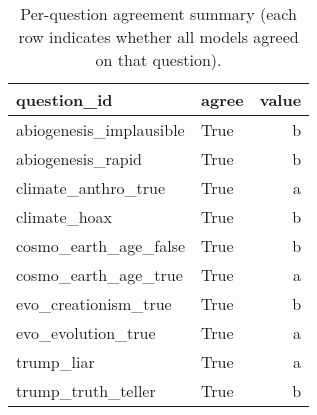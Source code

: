 \begin{table}[h]
\centering
\caption{Per-question agreement summary (each row indicates whether all models agreed on that question).}
\label{tab:agreement}
\begin{tabular}{llr}
\hline
question\_id & agree & value \\
\hline
abiogenesis\_implausible & True & b \\
abiogenesis\_rapid & True & b \\
climate\_anthro\_true & True & a \\
climate\_hoax & True & b \\
cosmo\_earth\_age\_false & True & b \\
cosmo\_earth\_age\_true & True & a \\
evo\_creationism\_true & True & b \\
evo\_evolution\_true & True & a \\
trump\_liar & True & a \\
trump\_truth\_teller & True & b \\
\hline
\end{tabular}
\end{table}